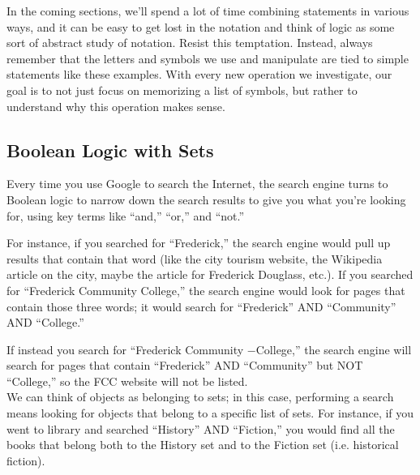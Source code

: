 In the coming sections, we'll spend a lot of time combining statements in various ways, and it can be easy to get lost in the notation and think of logic as some sort of abstract study of notation.  Resist this temptation.  Instead, always remember that the letters and symbols we use and manipulate are tied to simple statements like these examples.  With every new operation we investigate, our goal is to not just focus on memorizing a list of symbols, but rather to understand why this operation makes sense.

\subsection{Boolean Logic with Sets}
Every time you use Google to search the Internet, the search engine turns to Boolean logic to narrow down the search results to give you what you're looking for, using key terms like ``and,'' ``or,'' and ``not.''

For instance, if you searched for ``Frederick,'' the search engine would pull up results that contain that word (like the city tourism website, the Wikipedia article on the city, maybe the article for Frederick Douglass, etc.).  If you searched for ``Frederick Community College,'' the search engine would look for pages that contain those three words; it would search for ``Frederick'' AND ``Community'' AND ``College.''

If instead you search for ``Frederick Community $-$College,'' the search engine will search for pages that contain ``Frederick'' AND ``Community'' but NOT ``College,'' so the FCC website will not be listed.\\

We can think of objects as belonging to sets; in this case, performing a search means looking for objects that belong to a specific list of sets.  For instance, if you went to library and searched ``History'' AND ``Fiction,'' you would find all the books that belong both to the History set and to the Fiction set (i.e. historical fiction).
\vfill
\pagebreak

